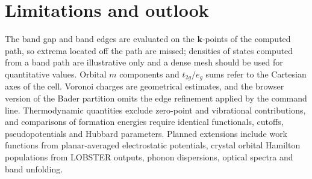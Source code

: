 \section{Limitations and outlook}
The band gap and band edges are evaluated on the $\bm{k}$-points of the computed path, so extrema located off the path are missed; densities of states computed from a band path are illustrative only and a dense mesh should be used for quantitative values. Orbital $m$ components and $t_{2g}/e_g$ sums refer to the Cartesian axes of the cell. Voronoi charges are geometrical estimates, and the browser version of the Bader partition omits the edge refinement applied by the command line. Thermodynamic quantities exclude zero-point and vibrational contributions, and comparisons of formation energies require identical functionals, cutoffs, pseudopotentials and Hubbard parameters. Planned extensions include work functions from planar-averaged electrostatic potentials, crystal orbital Hamilton populations from LOBSTER outputs, phonon dispersions, optical spectra and band unfolding.
